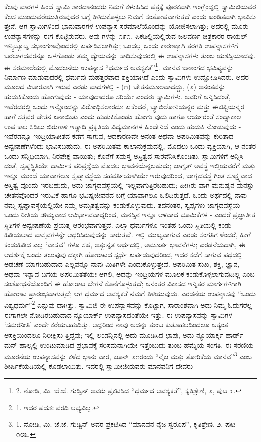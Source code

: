 ಕೆಲವು ವಾರಗಳ ಹಿಂದೆ ಸ್ವಾಮಿ ಶಾರದಾನಂದರು ನಿಮಗೆ ಕಳುಹಿಸಿದ ಪತ್ರಕ್ಕೆ ಪೂರಕವಾಗಿ ಇಂಗ್ಲೆಂಡ್ನಲ್ಲಿ ಸ್ವಾಮಿಜಿಯವರ ಕೆಲಸ ಮುಂದುವರೆಯುತ್ತಿರುವುದರ ಬಗ್ಗೆ ತಿಳಿದುಕೊಳ್ಳಲು ನಿಮಗೆ ಸಂತೋಷವಾಗುತ್ತದೆ ಎಂದು ಖಂಡಿತವಾಗಿ ಭಾವಿಸು ತ್ತೇನೆ. ಆಗ ಸ್ವಾಮಿಗಳಿಂದ ಭಾನುವಾರಗಳ ಉಪನ್ಯಾಸ ಸರಮಾಲೆಯೊಂದನ್ನು ಯೋಜಿಸಲಾಗಿತ್ತು; ಅದರಲ್ಲಿ ಮೂರು ಉಪನ್ಯಾಸಗಳನ್ನು ಈಗ ಕೊಟ್ಟಿರುವರು. ಅವು ಗಳನ್ನು ೧೯೧, ಪಿಕಡಿಲ್ಲಿಯಲ್ಲಿರುವ ಜಲವರ್ಣ ಚಿತ್ರಕಾರರ ರಾಯಲ್ ಇನ್ಸ್ಪಿಟ್ಯೂಟ್ನ ಸಭಾಂಗಣವೊಂದರಲ್ಲಿ ಏರ್ಪಡಿಸಲಾಗಿತ್ತು; ಒಂದಲ್ಲ ಒಂದು ಕಾರಣಕ್ಕಾಗಿ ತರಗತಿ ಉಪನ್ಯಾಸಗಳಿಗೆ ಬರಲಾಗದವರನ್ನೂ ಒಳಗೊಂಡು ತಮ್ಮ ಧ್ಯೇಯವನ್ನು ಸಾಧಿಸುವುದರಲ್ಲಿ ಈ ಉಪನ್ಯಾಸಗಳು ತುಂಬ ಯಶಸ್ವಿಯಾದವು. ಈ ಸರಮಾಲೆಯಲ್ಲಿ ಮೊದಲನೆಯ ಉಪನ್ಯಾಸ “ಧರ್ಮದ ಅವಶ್ಯಕತೆ”\footnote{2. ನೋಡಿ, ಮಿ. ಜೆ.ಜೆ. ಗುಡ್ವಿನ್ ಅವರು ಪ್ರಕಟಿಸಿದ “ಧರ್ಮದ ಆವಶ್ಯಕತೆ”, ಕೃತಿಶ್ರೇಣಿ, ೨, ಪುಟ ೩.}. ಮಾನವ ಜನಾಂಗದ ಭವಿಷ್ಯವನ್ನು ನಿರ್ಮಾಣ ಮಾಡುವುದರಲ್ಲಿ ಧರ್ಮವು ಮಹತ್ತರವಾದ ಶಕ್ತಿಯಾಗಿದೆ ಎಂದು ಸ್ವಾಮಿಗಳು ಉದ್ಘೋಷಿಸಿದರು. ಅದರ ಮೂಲದ ವಿಚಾರವಾಗಿ ಇರುವ ಎರಡು ವಾದಗಳಲ್ಲಿ - (೧) ಚೇತನಮೂಲವಾದದ್ದು, (೨) ಅನಂತವನ್ನು ಹುಡುಕಿಕೊಂಡು ಹೋಗುವುದು - ಯಾವುದಾದರೂ ಸರಿಯೇ ಎಂದರು ಸ್ವಾಮಿಗಳು. ಅವರಿಗೆ ಅನ್ನಿಸಿದಂತೆ, ಇವೆರಡರಲ್ಲಿ ಒಂದು ಇನ್ನೊಂದನ್ನು ವಿರೋಧಿಸಲಾರದು; ಏಕೆಂದರೆ, ಬ್ಯಾಬಿಲೋನಿಯನ್ನರ ಮತ್ತು ಈಜಿಪ್ಟಿಯನ್ನರ ಹಾಗೆ ಸತ್ತವರ ಚೇತನ ಏನಾಯಿತು ಎಂದು ಹುಡುಕಿಕೊಂಡು ಹೋಗು ವುದು ಹಾಗೂ ಆರ್ಯರಂತೆ ಸಂಧ್ಯಾಕಾಲ ಉಷಃಕಾಲ ಸಿಡಿಲು ಬಿರುಗಾಳಿ ಇತ್ಯಾದಿ ಪ್ರಕೃತಿಯ ವಿದ್ಯಮಾನಗಳ ಹಿಂದೇನಿದೆ ಎಂದು ಹುಡುಕಿ ನೋಡುವುದು - ಇವೆರಡನ್ನೂ ಇಂದ್ರಿಯಾತೀತದ ಕಡೆಗೆ ಸಾಗುವ, ಆದಕಾರಣವೇ ಅನಂತ ಅಥವಾ ಅಪರಿಮಿತವನ್ನು ಕುರಿತಾದ ಅನ್ವೇಷಣೆಗಳೆಂದು ಭಾವಿಸಬಹುದು. ಈ ಅಪರಿಮಿತವು ಕಾಲಾನುಕ್ರಮದಲ್ಲಿ, ಮೊದಲು ಒಂದು ವ್ಯಕ್ತಿಯಾಗಿ, ಆ ನಂತರ ಒಂದು ಸನ್ನಿಧಿಯಾಗಿ, ನಿರಪೇಕ್ಷ ವಾಯಿತು; ಕೊನೆಗೆ ಸಮಸ್ತ ಅಸ್ತಿತ್ವದ ಸಾರವೆನಿಸಿಕೊಂಡಿತು. ಸ್ವಾಮಿಗಳಿಗೆ ಅನ್ನಿಸಿ ದಂತೆ, ಸ್ವಪ್ನಸ್ಥಿತಿಯೇ ಧಾರ್ಮಿಕ ಪರಿಪ್ರಶ್ನೆಯ ಮೊದಲ ಭಾವನೆಯೆನ್ನಬಹುದು; ಜಾಗೃತ್ ಅವಸ್ಥೆ ಇಲ್ಲಿಯವರೆಗೆ ಮತ್ತು ಇನ್ನೂ ಮುಂದೆ ಯಾವಾಗಲೂ ಸ್ವಪ್ನಾವಸ್ಥೆಯ ಸಹವರ್ತಿಯಾಗಿಯೇ ಇರುವುದರಿಂದ, ಜಾಗೃದವಸ್ಥೆ ಗಿಂತ ಸೂಕ್ಷ್ಮವಾದ ಅಸ್ತಿತ್ವ ವೊಂದು ಇರಬಹುದು, ಅದು ಜಾಗೃದವಸ್ಥೆಯಲ್ಲಿ ಇಲ್ಲವಾಗುತ್ತಿರಬಹುದು; ಹೀಗಿರು ವಾಗ ಮನುಷ್ಯನ ಮನಸ್ಸು ಚೇತನವೊಂದರ ಇರುವಿಕೆ ಹಾಗೂ ಭವಿಷ್ಯಜೀವನದ ಬಗ್ಗೆ ಯಾವಾಗಲೂ ಒಲಿದಿರುತ್ತದೆ. ಒಂದು ಅರ್ಥದಲ್ಲಿ ನಾವು ನಮ್ಮ ಸ್ವಪ್ನಾವಸ್ಥೆಯಲ್ಲಿಯೇ ನಮ್ಮ ಅಮೃತತ್ವವನ್ನು ಕಂಡುಕೊಳ್ಳುವುದು. ತದನಂತರ, ಸ್ವಪ್ನಗಳು ಜಾಗೃದವಸ್ಥೆಯ ಒಂದು ರೀತಿಯ ಸೌಮ್ಯವಾದ ಆವಿರ್ಭಾವವಾದ್ದರಿಂದ, ಮನಸ್ಸಿನ ಇನ್ನೂ ಆಳವಾದ ಭೂಮಿಕೆಗಳ - ಎಂದರೆ ಪ್ರಜ್ಞಾತೀತ ಸ್ಥಿತಿಗಳ ಅನ್ವೇಷಣೆಯ ಪ್ರಯತ್ನ ಆರಂಭವಾಗುತ್ತದೆ. ಎಲ್ಲಾ ಧರ್ಮಗಳೂ ಇಂತಹ ಒಂದು ಸ್ಥಿತಿಯಲ್ಲಿ ಕಂಡು ಹಿಡಿಯಲಾದ ವಾಸ್ತವಗಳನ್ನೇ ಆಧರಿಸಿರುವುದನ್ನು ಸಾರುತ್ತವೆ. ಇಲ್ಲಿ ಮುಖ್ಯವಾಗುವ ಎರಡು ಸಂಗತಿಗ ಳೆಂದರೆ, ಹೀಗೆ ಕಂಡುಹಿಡಿದ ಎಲ್ಲ ‘ವಾಸ್ತವ’ ಗಳೂ ಸಹ, ಅತ್ಯುನ್ನತ ಅರ್ಥದಲ್ಲಿ, ಅಮೂರ್ತ ಭಾವನೆಗಳು; ಎರಡನೆಯದಾಗಿ, ಈ ಆದರ್ಶಕ್ಕೆ ಬಂದು ತಲುಪುವು ದಕ್ಕಾಗಿ ಹೋರಾಟದ ಸ್ಪರ್ಧೆ ಏರ್ಪಡುವುದರಿಂದ, ಇದರ ಕಡೆಗೆ ಸಾಗುವ ಪಥದಲ್ಲಿ ಅಡಚಣೆ ಯಾಗಬಹುದಾದ ಎಲ್ಲವನ್ನೂ ನಾವು ಮಿತಿಗಳೇ ಎಂದುಕೊಳ್ಳುತ್ತೇವೆ. ಅಪರಿಮಿತ ಸುಖ, ಶಕ್ತಿ, ಜ್ಞಾನ, ಅಥವಾ ಇನ್ನಾವ ಬಗೆಯ ಅಪರಿಮಿತತೆಯೇ ಆಗಲಿ, ಅದನ್ನು ಇಂದ್ರಿಯಗಳ ಮೂಲಕ ಕಂಡುಕೊಳ್ಳಲಾಗುವುದಿಲ್ಲ ಎಂಬ ಸಂಶೋಧನೆಯೊಂದಿಗೆ ಈ ಹೋರಾಟ ಬೇಗನೆ ಕೊನೆಗೊಳ್ಳುತ್ತದೆ; ಅನಂತರ ವಿಕಾಸದ ಇನ್ನಿತರ ಮಾರ್ಗಗಳಿಗಾಗಿ ಹೋರಾಟ ಪ್ರಾರಂಭವಾಗುತ್ತದೆ; ಆಗ ಧರ್ಮದ ಆವಶ್ಯಕತೆ ನಮಗೆ ತಿಳಿಯುವುದು. ಎರಡನೆಯ ಉಪನ್ಯಾಸವು “ಒಂದು ವಿಶ್ವಧರ್ಮ”\footnote{1. ಇದರ ಪದಶಃ ವರದಿ ಲಭ್ಯವಿಲ್ಲ.} ಎನ್ನುವು ದಾಗಿತ್ತು. ಸ್ವಾಮಿಜಿ ಈ ಉಪನ್ಯಾಸವನ್ನು ಕೊಟ್ಟಾಗ, ಸಾರಾಂಶವಾಗಿ ಅದು ನಿಮ್ಮ ಓದುಗರೆಲ್ಲ ಈಗಾಗಲೇ ನೋಡಿರಬಹುದಾದ ನ್ಯೂಯಾರ್ಕ್ ಉಪನ್ಯಾಸದಂತೆಯೇ ಇತ್ತು. ಈ ಉಪನ್ಯಾಸವನ್ನು ಸ್ವಾಮಿಗಳ ‘ಸಮರನೀತಿ’ ಎಂದೇ ಕರೆಯಬಹುದಿತ್ತು. ಆದ್ದರಿಂದ ನಾವು ಅದನ್ನು ತುಂಬ ಕುತೂಹಲದಿಂದಲೂ ಅತ್ಯಂತ ಆಸಕ್ತಿಯಿಂದಲೂ ನಿರೀಕ್ಷಿಸು ತ್ತಿದ್ದೆವು; ಇಲ್ಲಿ ಲಂಡನ್ನಿನಲ್ಲಿ ಅದು ಮೂಡಿಸಿದ ಛಾಪು, ಅದು ನ್ಯೂಯಾರ್ಕ್ನ ಹಾರ್ಡ್ ಮನ್ ಹಾಲ್ನಲ್ಲಿ ಉಂಟುಮಾಡಿದ ಪ್ರಭಾವಕ್ಕೆ ಸರಿಸಮನಾಗಿಯೇ ಇತ್ತೆಂಬುದು ತುಂಬ ಹೆಮ್ಮೆಯ ಸಂಗತಿ. ಈ ಸರಣಿಯ ಮೂರನೆಯ ಉಪನ್ಯಾಸವನ್ನು ಕಳೆದ ಭಾನು ವಾರ, ಜೂನ್ ೨೧ರಂದು “ನೈಜ ಮತ್ತು ತೋರಿಕೆಯ ಮಾನವ”\footnote{1. ನೋಡಿ, ಮಿ. ಜೆ.ಜೆ. ಗುಡ್ವಿನ್ ಅವರ ಪ್ರಕಟಿಸಿದ “ಮಾನವನ ನೈಜ ಸ್ವರೂಪ”, ಕೃತಿಶ್ರೇಣಿ, ೨, ಪುಟ ೧೮೩.} ಎಂಬ ಶೀರ್ಷಿಕೆಯಡಿಯಲ್ಲಿ ಕೊಡಲಾಯಿತು. ಇದರಲ್ಲಿ ಸ್ವಾಮೀಜಿಯವರು ಮಾನವನಿಗೆ ದೇವರು 